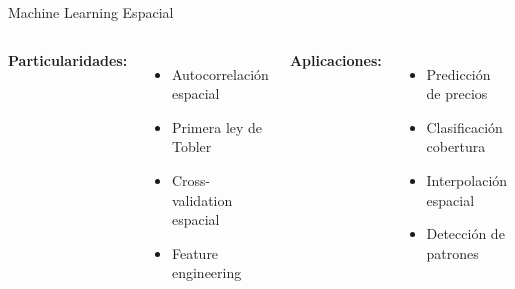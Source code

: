 \documentclass[10pt,aspectratio=169]{beamer}
\begin{document}
\begin{frame}[fragile]{Machine Learning Espacial}
    \begin{columns}[T]
        \footnotesize
        \textbf{Particularidades:}
        \begin{itemize}
            \item Autocorrelación espacial
            \item Primera ley de Tobler
            \item Cross-validation espacial
            \item Feature engineering
        \end{itemize}
        
        \textbf{Aplicaciones:}
        \begin{itemize}
            \item Predicción de precios
            \item Clasificación cobertura
            \item Interpolación espacial
            \item Detección de patrones
        \end{itemize}
        
        \begin{lstlisting}[language=Python]
from sklearn.ensemble import RandomForestRegressor
import geopandas as gpd

# Features espaciales
gdf['dist_centro'] = gdf.distance(centro)
gdf['dist_metro'] = gdf.distance(metro)
gdf['n_vecinos'] = gdf.buffer(500).apply(
    lambda x: puntos.within(x).sum()
)

# Lag espacial
from libpysal.weights import KNN
w = KNN.from_dataframe(gdf, k=5)
gdf['precio_lag'] = w.lag(gdf['precio'])

# Modelo
X = gdf[['area', 'dist_centro', 
         'dist_metro', 'precio_lag']]
y = gdf['precio']
model = RandomForestRegressor()
model.fit(X, y)
        \end{lstlisting}
    \end{columns}
\end{frame}
\end{document}
